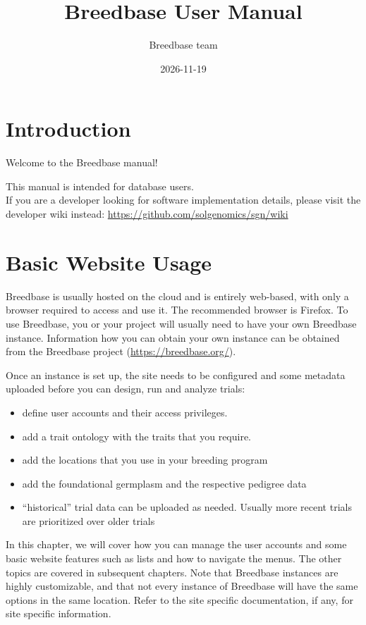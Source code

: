 \documentclass[
  12pt,
]{book}
\title{Breedbase User Manual}
\author{Breedbase team}
\date{2026-11-19}
\begin{document}
\maketitle

{
\hypersetup{linkcolor=}
\setcounter{tocdepth}{2}
\tableofcontents
}
\hypertarget{introduction}{%
\chapter*{Introduction}\label{introduction}}


Welcome to the Breedbase manual!

This manual is intended for database users.\\
If you are a developer looking for software implementation details, please visit the developer wiki instead: \url{https://github.com/solgenomics/sgn/wiki}

\hypertarget{basic-website-usage}{%
\chapter{Basic Website Usage}\label{basic-website-usage}}

Breedbase is usually hosted on the cloud and is entirely web-based, with only a browser required to access and use it. The recommended browser is Firefox. To use Breedbase, you or your project will usually need to have your own Breedbase instance. Information how you can obtain your own instance can be obtained from the Breedbase project (\url{https://breedbase.org/}).

Once an instance is set up, the site needs to be configured and some metadata uploaded before you can design, run and analyze trials:

\begin{itemize}
\item
  define user accounts and their access privileges.
\item
  add a trait ontology with the traits that you require.
\item
  add the locations that you use in your breeding program
\item
  add the foundational germplasm and the respective pedigree data
\item
  ``historical'' trial data can be uploaded as needed. Usually more recent trials are prioritized over older trials
\end{itemize}

In this chapter, we will cover how you can manage the user accounts and some basic website features such as lists and how to navigate the menus. The other topics are covered in subsequent chapters. Note that Breedbase instances are highly customizable, and that not every instance of Breedbase will have the same options in the same location. Refer to the site specific documentation, if any, for site specific information.
\end{document}
